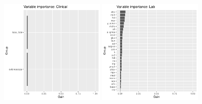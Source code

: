 \documentclass[12pt]{article}
\begin{document}
\begin{figure}[h]
\includegraphics[width=0.45\textwidth]{figures/vi_group_Clinical_.pdf}
\includegraphics[width=0.45\textwidth]{figures/vi_group_Lab_.pdf}
\end{figure}
\end{document}
